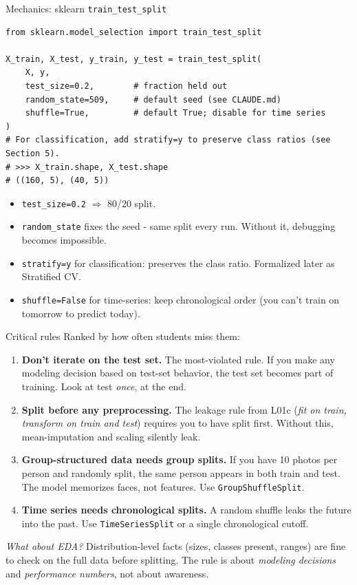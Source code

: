 \documentclass[aspectratio=169]{beamer}
\begin{document}
\begin{frame}[fragile]{Mechanics: sklearn \texttt{train\_test\_split}}
\begin{lstlisting}
from sklearn.model_selection import train_test_split

X_train, X_test, y_train, y_test = train_test_split(
    X, y,
    test_size=0.2,        # fraction held out
    random_state=509,     # default seed (see CLAUDE.md)
    shuffle=True,         # default True; disable for time series
)
# For classification, add stratify=y to preserve class ratios (see Section 5).
# >>> X_train.shape, X_test.shape
# ((160, 5), (40, 5))
\end{lstlisting}
  \vfill
  \begin{itemize}\small
    \item \texttt{test\_size=0.2} $\Rightarrow$ 80/20 split.
    \item \texttt{random\_state} fixes the seed - same split every run. Without it, debugging becomes impossible.
    \item \texttt{stratify=y} for classification: preserves the class ratio. Formalized later as Stratified CV.
    \item \texttt{shuffle=False} for time-series: keep chronological order (you can't train on tomorrow to predict today).
  \end{itemize}
\end{frame}

\begin{frame}{Critical rules}
  Ranked by how often students miss them:
  \begin{enumerate}
    \item \textbf{Don't iterate on the test set.} The most-violated rule. If you make any modeling decision based on test-set behavior, the test set becomes part of training. Look at test \emph{once}, at the end.
    \item \textbf{Split before any preprocessing.} The leakage rule from L01c (\emph{fit on train, transform on train and test}) requires you to have split first. Without this, mean-imputation and scaling silently leak.
    \item \textbf{Group-structured data needs group splits.} If you have 10 photos per person and randomly split, the same person appears in both train and test. The model memorizes faces, not features. Use \texttt{GroupShuffleSplit}.
    \item \textbf{Time series needs chronological splits.} A random shuffle leaks the future into the past. Use \texttt{TimeSeriesSplit} or a single chronological cutoff.
  \end{enumerate}
  \vfill
  \small\emph{What about EDA?} Distribution-level facts (sizes, classes present, ranges) are fine to check on the full data before splitting. The rule is about \emph{modeling decisions} and \emph{performance numbers}, not about awareness.
\end{frame}
\end{document}
